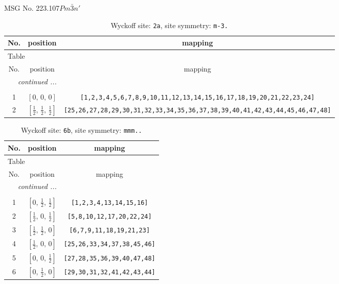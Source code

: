 \documentclass[fleqn,8pt]{jsarticle}
\begin{document}
\setcounter{MaxMatrixCols}{32}

\renewcommand{\tablename}{Table~}
\renewcommand{\figurename}{Figure~}
\begin{center}
\LARGE
MSG No. 223.107\quad$Pm\bar{3}n'$
\end{center}
\renewcommand{\arraystretch}{1.2}
\begin{longtable}{ccc}
\caption{Wyckoff site: {\tt 2a}, site symmetry: {\tt m-3.}}
 \\
 \hline \hline
No. & position & mapping \\ \hline \endfirsthead

\multicolumn{2}{l}{\tablename\ \thetable{}} \\
 \hline \hline
No. & position & mapping \\ \hline \endhead

 \hline \hline
\multicolumn{2}{r}{\footnotesize\it continued ...} \\ \endfoot

 \hline \hline
\multicolumn{2}{r}{} \\ \endlastfoot

1 & $\left[ 0,\, 0,\, 0 \right]$ & {\tt [1,2,3,4,5,6,7,8,9,10,11,12,13,14,15,16,17,18,19,20,21,22,23,24]} \\ \hline
2 & $\left[ \frac{1}{2},\, \frac{1}{2},\, \frac{1}{2} \right]$ & {\tt [25,26,27,28,29,30,31,32,33,34,35,36,37,38,39,40,41,42,43,44,45,46,47,48]} \\
\end{longtable}
\renewcommand{\arraystretch}{1.2}
\begin{longtable}{ccc}
\caption{Wyckoff site: {\tt 6b}, site symmetry: {\tt mmm..}}
 \\
 \hline \hline
No. & position & mapping \\ \hline \endfirsthead

\multicolumn{2}{l}{\tablename\ \thetable{}} \\
 \hline \hline
No. & position & mapping \\ \hline \endhead

 \hline \hline
\multicolumn{2}{r}{\footnotesize\it continued ...} \\ \endfoot

 \hline \hline
\multicolumn{2}{r}{} \\ \endlastfoot

1 & $\left[ 0,\, \frac{1}{2},\, \frac{1}{2} \right]$ & {\tt [1,2,3,4,13,14,15,16]} \\ \hline
2 & $\left[ \frac{1}{2},\, 0,\, \frac{1}{2} \right]$ & {\tt [5,8,10,12,17,20,22,24]} \\ \hline
3 & $\left[ \frac{1}{2},\, \frac{1}{2},\, 0 \right]$ & {\tt [6,7,9,11,18,19,21,23]} \\ \hline
4 & $\left[ \frac{1}{2},\, 0,\, 0 \right]$ & {\tt [25,26,33,34,37,38,45,46]} \\ \hline
5 & $\left[ 0,\, 0,\, \frac{1}{2} \right]$ & {\tt [27,28,35,36,39,40,47,48]} \\ \hline
6 & $\left[ 0,\, \frac{1}{2},\, 0 \right]$ & {\tt [29,30,31,32,41,42,43,44]} \\
\end{longtable}
\end{document}
